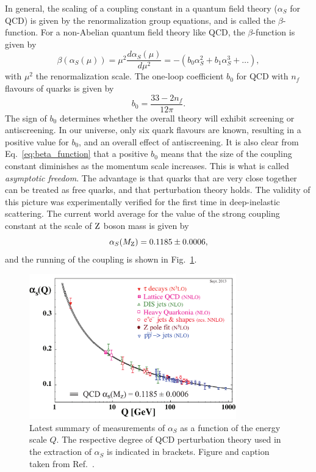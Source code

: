 In general, the scaling of a coupling constant in a quantum field theory ($\alpha_S$ for QCD) is
given by the renormalization group equations, and is called the $\beta$-function. For a non-Abelian
quantum field theory like QCD, the $\beta$-function is given by
\begin{equation}
\beta(\alpha_S(\mu)) = \mu^2 \frac{d\alpha_S(\mu)}{d\mu^2} = - (b_0 \alpha_S^2 +  b_1 \alpha_S^3 +
\ldots), 
\label{eq:beta_function}
\end{equation}
with $\mu^2$ the renormalization scale. The one-loop coefficient $b_0$ for QCD with $n_f$ flavours
of quarks is given by
\begin{equation}
  b_0 = \frac{33 - 2n_f}{12\pi}.
\end{equation}
The sign of $b_0$ determines whether the overall theory will exhibit screening or antiscreening. In
our universe, only six quark flavours are known, resulting in a positive value for $b_0$, and an
overall effect of antiscreening. 
It is also clear from Eq.~\ref{eq:beta_function} that a positive $b_0$ means that the size of the
coupling constant diminishes as the momentum scale increases. This is what is called
\textit{asymptotic freedom}. The advantage is that quarks that are very close together can be
treated as free quarks, and that perturbation theory holds. The validity of this picture was
experimentally verified for the first time in deep-inelastic scattering. 
The current world average for the value of the strong coupling constant at the scale of $\mathrm{Z}$
boson mass is given by
\begin{equation}
  \alpha_S(M_{\mathrm{Z}}) = 0.1185 \pm 0.0006, 
\end{equation}
and the running of the coupling is shown in Fig.~\ref{fig:running_coupling}. 

\begin{figure}[htpb]
  \centering
  \includegraphics[width=0.8\textwidth]{figures/standardmodel/asq-2013}
  \caption{Latest summary of measurements of $\alpha_S$ as a function of the energy scale $Q$.
The respective degree of QCD perturbation theory used in the extraction of $\alpha_S$ is
indicated in brackets. Figure and caption taken from Ref.~\cite{Agashe:2014kda}.
  \label{fig:running_coupling}}
\end{figure}

